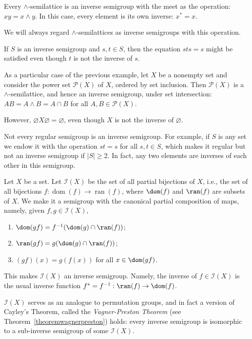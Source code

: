 \begin{example}
Every $\land$-semilattice is an inverse semigroup with the meet as the operation: $xy=x\land y$. In this case, every element is its own inverse: $x^*=x$.

We will always regard $\land$-semilattices as inverse semigroups with this operation.
\end{example}

\begin{example}
	If $S$ is an inverse semigroup and $s,t\in S$, then the equation $sts=s$ might be satisfied even though $t$ is not the inverse of $s$.
	
	As a particular case of the previous example, let $X$ be a nonempty set and consider the power set $\mathcal{P}(X)$ of $X$, ordered by set inclusion. Then $\mathcal{P}(X)$ is a $\land$-semilattice, and hence an inverse semigroup, under set intersection: $AB=A\land B=A\cap B$ for all $A,B\in\mathcal{P}(X)$.
	
	However, $\varnothing X\varnothing=\varnothing$, even though $X$ is not the inverse of $\varnothing$.
\end{example}

\begin{example}
Not every regular semigroup is an inverse semigroup. For example, if $S$ is any set we endow it with the operation $st=s$ for all $s,t\in S$, which makes it regular but not an inverse semigroup if $|S|\geq 2$. In fact, any two elements are inverses of each other in this semigroup.
\end{example}

\begin{example}
Let $X$ be a set. Let $\mathcal{I}(X)$ be the set of all partial bijections of $X$, i.e., the set of all bijections $f:\operatorname{dom}(f)\to\operatorname{ran}(f)$, where $\dom(f)$ and $\ran(f)$ are subsets of $X$. We make it a semigroup with the canonical partial composition of maps, namely, given $f,g\in\mathcal{I}(X)$,
\begin{enumerate}
\item $\dom(gf)=f^{-1}(\dom(g)\cap\ran(f))$;
\item $\ran(gf)=g(\dom(g)\cap\ran(f))$;
\item $(gf)(x)=g(f(x))$ for all $x\in\dom(gf)$.
\end{enumerate}
This makes $\mathcal{I}(X)$ an inverse semigroup. Namely, the inverse of $f\in\mathcal{I}(X)$ is the usual inverse function $f^*=f^{-1}:\ran(f)\to\dom(f)$.

$\mathcal{I}(X)$ serves as an analogue to permutation groups, and in fact a version of Cayley's Theorem, called the \emph{Vagner-Preston Theorem} (see Theorem~\ref{theoremwagnerpreston}) holds: every inverse semigroup is isomorphic to a sub-inverse semigroup of some $\mathcal{I}(X)$.
\end{example}

